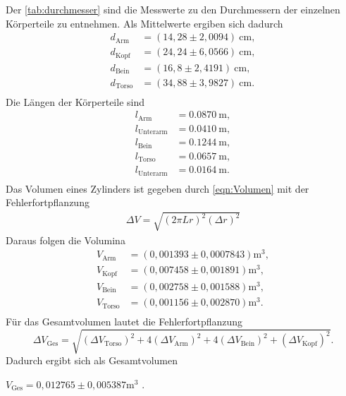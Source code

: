 Der \autoref{tab:durchmesser} sind die Messwerte zu den Durchmessern der einzelnen Körperteile zu entnehmen. Als Mittelwerte ergiben sich dadurch
\begin{align*}
  d_{\text{Arm}} &= (14,28 \pm 2,0094)\: \si{\centi\meter}, \\
  d_{\text{Kopf}} &= (24,24 \pm 6,0566)\: \si{\centi\meter}, \\
  d_{\text{Bein}} &= (16,8 \pm 2,4191)\: \si{\centi\meter}, \\
  d_{\text{Torso}} &= (34,88 \pm 3,9827)\: \si{\centi\meter}. \\ 
\end{align*}
Die Längen der Körperteile sind
\begin{align*}
  l_{\text{Arm}} &= \SI{0,0870}{\meter}, \\
  l_{\text{Unterarm}} &= \SI{0,0410}{\meter}, \\
  l_{\text{Bein}} &= \SI{0,1244}{\meter}, \\
  l_{\text{Torso}} &= \SI{0,0657}{\meter}, \\
  l_{\text{Unterarm}} &= \SI{0,0164}{\meter}. \\
\end{align*}
Das Volumen eines Zylinders ist gegeben durch \autoref{eqn:Volumen} mit der Fehlerfortpflanzung
\begin{align*}
  \Delta V = \sqrt{(2 \pi Lr)^2 (\Delta r)^2}
\end{align*}
Daraus folgen die Volumina
\begin{align*}
  V_{\text{Arm}} &= (0,001393 \pm 0,0007843) \si{\meter}^3, \\
  V_{\text{Kopf}} &= (0,007458 \pm 0,001891) \si{\meter}^3, \\
  V_{\text{Bein}} &= (0,002758 \pm 0,001588) \si{\meter}^3 ,\\
  V_{\text{Torso}} &= (0,001156 \pm 0,002870) \si{\meter}^3. \\
\end{align*}
Für das Gesamtvolumen lautet die Fehlerfortpflanzung
\begin{equation}
  \Delta V_{\text{Ges}} = \sqrt{(\Delta V_{\text{Torso}})^2 + 4(\Delta V_{\text{Arm}})^2 + 4(\Delta V_{\text{Bein}})^2 + (\Delta V_{\text{Kopf}})^2}.
\end{equation}
Dadurch ergibt sich als Gesamtvolumen
\begin{center}
  $V_{\text{Ges}} = 0,012765 \pm 0,005387 \si{\meter}^3$ .
\end{center}

